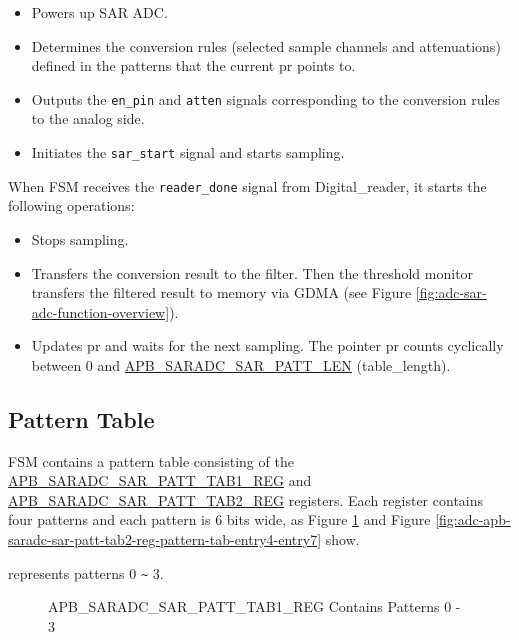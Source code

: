 \documentclass[main\_\_EN.tex]{subfiles}
\begin{document}
\begin{itemize}
    \item Powers up SAR ADC.
    \item Determines the conversion rules (selected sample channels and attenuations) defined in the patterns that the current pr points to.
    \item Outputs the \texttt{en\_pin} and \texttt{atten} signals corresponding to the conversion rules to the analog side.
    \item Initiates the \texttt{sar\_start} signal and starts sampling.
\end{itemize}

When FSM receives the \texttt{reader\_done} signal from Digital\_reader, it starts the following operations:
    \begin{itemize}
        \item Stops sampling.
        \item Transfers the conversion result to the filter. Then the threshold monitor transfers the filtered result to memory via GDMA (see Figure \ref{fig:adc-sar-adc-function-overview}).
        \item Updates pr and waits for the next sampling. The pointer pr counts cyclically between 0 and \hyperref[fielddesc:APBSARADCSARPATTLEN]{APB\_SARADC\_SAR\_PATT\_LEN} (table\_length).
    \end{itemize}

\subsection{Pattern Table}\label{sec:adc_pattern}

FSM contains a pattern table consisting of the \hyperref[regdesc:APBSARADCSARPATTTAB1REG]{APB\_SARADC\_SAR\_PATT\_TAB1\_REG} and \hyperref[regdesc:APBSARADCSARPATTTAB1REG]{APB\_SARADC\_SAR\_PATT\_TAB2\_REG} registers. Each register contains four patterns and each pattern is 6 bits wide, as Figure \ref{fig:adc-apb-saradc-sar-patt-tab1-reg-pattern-tab-entry0-entry3} and Figure \ref{fig:adc-apb-saradc-sar-patt-tab2-reg-pattern-tab-entry4-entry7} show.

%
%
%
%
%
\begin{regdesc}\begin{reglist}
\item [cmd \regindex{x}] represents patterns 0 \verb+~+ 3.
\end{reglist}\end{regdesc}
\vspace{-2em}
\begin{figure}[H]
    \centering
    \caption{APB\_SARADC\_SAR\_PATT\_TAB1\_REG Contains Patterns 0 - 3}
    \label{fig:adc-apb-saradc-sar-patt-tab1-reg-pattern-tab-entry0-entry3}
\end{figure}
\end{document}
